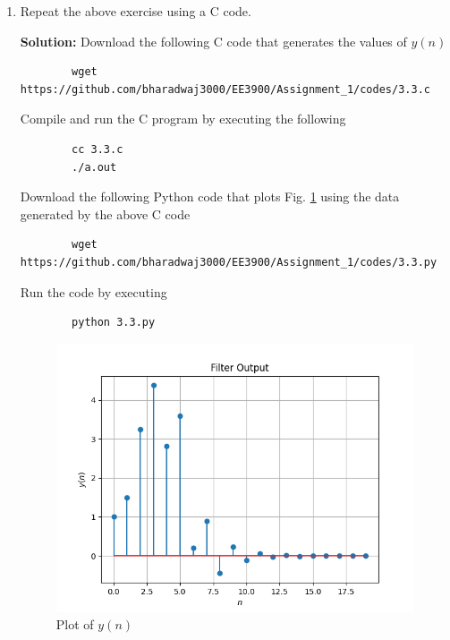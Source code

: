 \documentclass[journal,12pt,twocolumn]{IEEEtran}
\newcommand{\solution}{\noindent \textbf{Solution: }}
\numberwithin{equation}{section}
\renewcommand\thesection{\arabic{section}}
\begin{document}
\begin{enumerate}[label=\thesection.\arabic*,ref=\thesection.\theenumi]
	\item Repeat the above exercise using a C code.
	
	\solution Download the following C code that generates the values of $y(n)$
	\begin{lstlisting}
		wget https://github.com/bharadwaj3000/EE3900/Assignment_1/codes/3.3.c
	\end{lstlisting}
	
	Compile and run the C program by executing the following
	\begin{lstlisting}
		cc 3.3.c
		./a.out
	\end{lstlisting}
	
	Download the following Python code that plots Fig. \ref{fig-3.3} using the data generated by the above C code
	\begin{lstlisting}
		wget https://github.com/bharadwaj3000/EE3900/Assignment_1/codes/3.3.py
	\end{lstlisting}
	
	Run the code by executing
	\begin{lstlisting}
		python 3.3.py
	\end{lstlisting}

	\begin{figure}[!ht]
		\centering
		\includegraphics[width=\columnwidth]{./figs/3.3.png}
		\caption{Plot of $y(n)$}
		\label{fig-3.3}	
	\end{figure}
	
	\end{enumerate}
	
\end{document}
